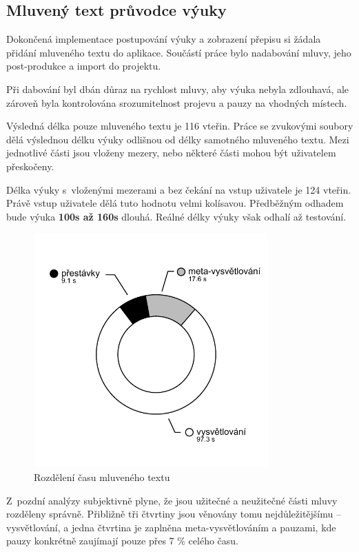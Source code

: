 \subsection{Mluvený text průvodce
výuky}\label{mluvenuxfd-text-prux16fvodce-vuxfduky}

Dokončená implementace postupování výuky a zobrazení přepisu si žádala
přidání mluveného textu do aplikace. Součástí práce bylo nadabování
mluvy, jeho post-produkce a import do projektu.

Při dabování byl dbán důraz na rychlost mluvy, aby výuka nebyla
zdlouhavá, ale zároveň byla kontrolována srozumitelnost projevu a pauzy
na vhodných místech.

Výsledná délka pouze mluveného textu je 116 vteřin. Práce se zvukovými
soubory dělá výslednou délku výuky odlišnou od délky samotného mluveného
textu. Mezi jednotlivé části jsou vloženy mezery, nebo některé části
mohou být uživatelem přeskočeny. 

Délka výuky s~vloženými mezerami a bez
čekání na vstup uživatele je 124 vteřin. Právě vstup uživatele dělá tuto
hodnotu velmi kolísavou. Předběžným odhadem bude výuka \textbf{100s až
160s} dlouhá. Reálné délky výuky však odhalí až testování.

\begin{figure}[h!]
\centering
\includegraphics[height=9cm]{src/assets/time-chart.pdf}
\caption{Rozdělení času mluveného textu}
\end{figure}

Z~pozdní analýzy subjektivně plyne, že jsou užitečné a neužitečné
části mluvy rozděleny správně. Přibližně tři čtvrtiny jsou věnovány
tomu nejdůležitějšímu -- vysvětlování, a jedna čtvrtina je zaplněna
meta-vysvětlováním a pauzami, kde pauzy konkrétně zaujímají pouze přes 7
\% celého času.

